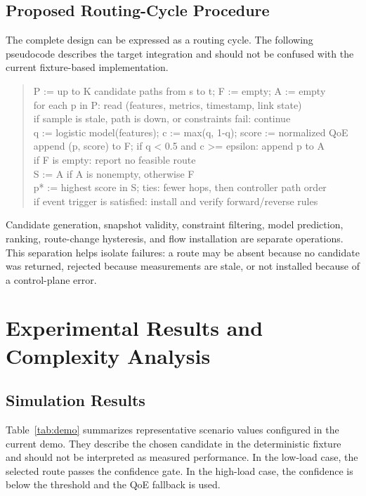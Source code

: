 \documentclass[conference]{IEEEtran}
\begin{document}
\subsection{Proposed Routing-Cycle Procedure}
The complete design can be expressed as a routing cycle. The following pseudocode describes the target integration and should not be confused with the current fixture-based implementation.
\begin{quote}\small\ttfamily
P := up to K candidate paths from s to t; F := empty; A := empty\\
for each p in P: read (features, metrics, timestamp, link state)\\
if sample is stale, path is down, or constraints fail: continue\\
q := logistic model(features); c := max(q, 1-q); score := normalized QoE\\
append (p, score) to F; if q < 0.5 and c >= epsilon: append p to A\\
if F is empty: report no feasible route\\
S := A if A is nonempty, otherwise F\\
p* := highest score in S; ties: fewer hops, then controller path order\\
if event trigger is satisfied: install and verify forward/reverse rules
\end{quote}
Candidate generation, snapshot validity, constraint filtering, model prediction, ranking, route-change hysteresis, and flow installation are separate operations. This separation helps isolate failures: a route may be absent because no candidate was returned, rejected because measurements are stale, or not installed because of a control-plane error.

\section{Experimental Results and Complexity Analysis}
\subsection{Simulation Results}
Table~\ref{tab:demo} summarizes representative scenario values configured in the current demo. They describe the chosen candidate in the deterministic fixture and should not be interpreted as measured performance. In the low-load case, the selected route passes the confidence gate. In the high-load case, the confidence is below the threshold and the QoE fallback is used.
\end{document}

